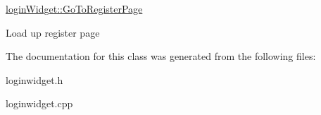 \hyperlink{classloginWidget_afcb096399c33f93111861cf221c833bb}{login\-Widget\-::\-Go\-To\-Register\-Page} 

Load up register page 

The documentation for this class was generated from the following files\-:\begin{DoxyCompactItemize}
\item 
loginwidget.\-h\item 
loginwidget.\-cpp\end{DoxyCompactItemize}
